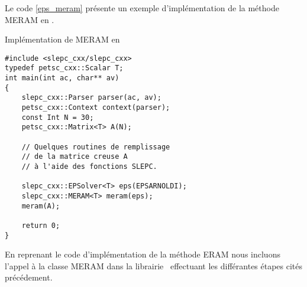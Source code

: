 Le code \ref{eps_meram} présente un exemple d'implémentation de la méthode MERAM en \slepcx.

\begin{algorithm}[h]
  \caption{Implémentation de MERAM en \slepcx}
  \label{eps_meram}
\begin{verbatim}
#include <slepc_cxx/slepc_cxx>
typedef petsc_cxx::Scalar T;
int main(int ac, char** av)
{
    slepc_cxx::Parser parser(ac, av);
    petsc_cxx::Context context(parser);
    const Int N = 30;
    petsc_cxx::Matrix<T> A(N);

    // Quelques routines de remplissage
    // de la matrice creuse A
    // à l'aide des fonctions SLEPC.

    slepc_cxx::EPSolver<T> eps(EPSARNOLDI);
    slepc_cxx::MERAM<T> meram(eps);
    meram(A);

    return 0;
}
\end{verbatim}
\end{algorithm}

En reprenant le code d'implémentation de la méthode ERAM nous incluons l'appel à la classe MERAM dans la librairie \slepcx\ effectuant les différantes étapes cités précédement.
